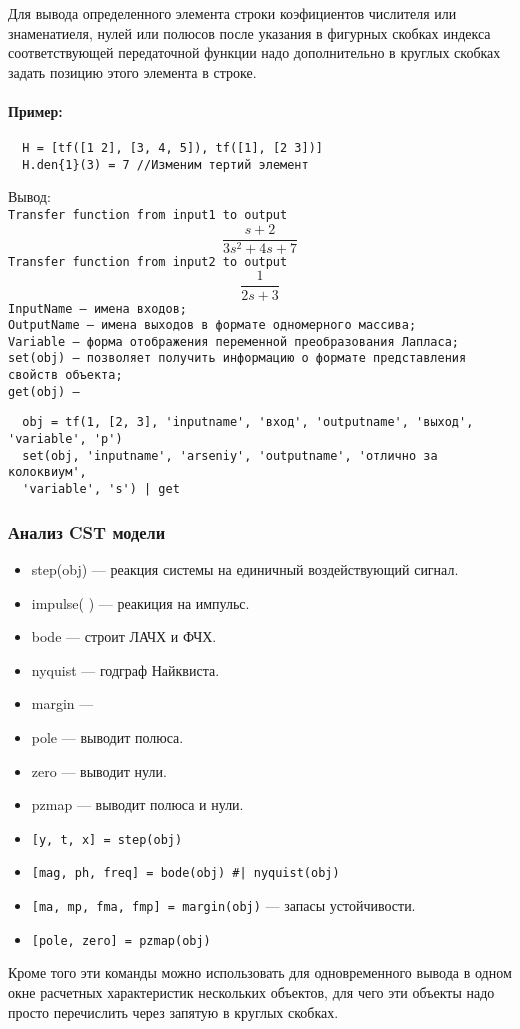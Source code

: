 \begin{enumerate}
    Для вывода определенного элемента строки коэфициентов числителя или
    знаменатиеля, нулей или полюсов после указания в фигурных скобках индекса
    соответствующей передаточной функции надо дополнительно в круглых скобках
    задать позицию этого элемента в строке.
\end{enumerate}

\paragraph{Пример:}
\begin{verbatim}
  H = [tf([1 2], [3, 4, 5]), tf([1], [2 3])]
  H.den{1}(3) = 7 //Изменим тертий элемент
\end{verbatim}
Вывод:\\
\verb!Transfer function from input1 to output!
\[ \frac{s+2}{3s^2 + 4s + 7} \] 
\verb!Transfer function from input2 to output!
\[ \frac{1}{2s + 3} \] 
\texttt{InputName --- имена входов;\\ OutputName --- имена выходов в формате
одномерного массива; \\ Variable --- форма отображения переменной преобразования
Лапласа;\\ set(obj) --- позволяет получить информацию о формате представления
свойств объекта;\\ get(obj) --- }\par
\begin{verbatim}
  obj = tf(1, [2, 3], 'inputname', 'вход', 'outputname', 'выход', 'variable', 'p')
  set(obj, 'inputname', 'arseniy', 'outputname', 'отлично за колоквиум',
  'variable', 's') | get
\end{verbatim}

\subsubsection{Анализ CST модели}
\begin{itemize}
  \item step(obj) --- реакция системы на единичный воздействующий сигнал.
  \item impulse(  ) --- реакиция на импульс.
  \item bode --- строит ЛАЧХ и ФЧХ.
  \item nyquist --- годграф Найквиста.
  \item margin --- 
  \item pole --- выводит полюса.
  \item zero --- выводит нули.
  \item pzmap --- выводит полюса и нули.
  \item \verb![y, t, x] = step(obj)!
  \item \verb![mag, ph, freq] = bode(obj) #| nyquist(obj)!
  \item \verb![ma, mp, fma, fmp] = margin(obj)! --- запасы устойчивости.
  \item \verb![pole, zero] = pzmap(obj)!
\end{itemize}\par
Кроме того эти команды можно использовать для одновременного вывода в одном окне
расчетных характеристик нескольких объектов, для чего эти объекты надо просто
перечислить через запятую в круглых скобках.
